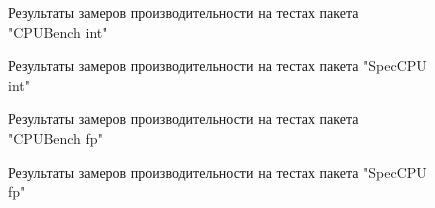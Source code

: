 \begin{figure}[ht]
	\caption{Результаты замеров производительности на тестах  пакета "CPUBench int"\phantom{}}\label{fig:spubench_int_speedup}
\end{figure}

\begin{figure}[ht]
	\caption{Результаты замеров производительности на тестах пакета "SpecCPU int"\phantom{}}\label{fig:spec_int_speedup}
\end{figure}

\begin{figure}[ht]
	\caption{Результаты замеров производительности на тестах  пакета "CPUBench fp"\phantom{}}\label{fig:pubench_fp_speedup}
\end{figure}

\begin{figure}[ht]
	\caption{Результаты замеров производительности на тестах пакета "SpecCPU fp"\phantom{}}\label{fig:spec_fp_speedup}
\end{figure}


